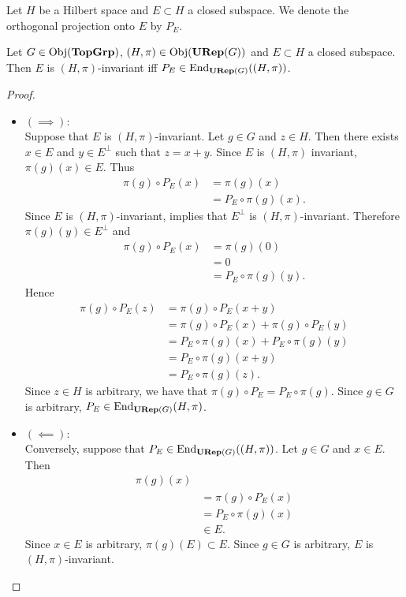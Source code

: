 \documentclass{book}
\begin{document}
\begin{note}
	Let $H$ be a Hilbert space and $E \subset H$ a closed subspace. We denote the orthogonal projection onto $E$ by $P_E$.
\end{note}

\begin{ex}
	Let $G \in \operatorname{Obj}(\operatorname*{\text{\textbf{TopGrp}}})$, $(H, \pi) \in \operatorname{Obj}(\operatorname*{\text{\textbf{URep}}}(G))$ and $E \subset H$ a closed subspace. Then $E$ is $(H, \pi)$-invariant iff $P_E \in \operatorname{\text{End}}_{\operatorname*{\text{\textbf{URep}}}(G)}((H, \pi))$.
\end{ex}

\begin{proof}\
	\begin{itemize}
		\item $(\implies):$ \\
		Suppose that $E$ is $(H, \pi)$-invariant. Let $g \in G$ and $z \in H$. Then there exists $x \in E$ and $y \in E^{\perp}$ such that $z = x+y$. Since $E$ is $(H, \pi)$ invariant, $\pi(g)(x) \in E$. Thus 
		\begin{align*}
			\pi(g) \circ P_E (x) 
			& = \pi(g)(x) \\
			& = P_E \circ \pi(g)(x).
		\end{align*} 
		Since $E$ is $(H, \pi)$-invariant,  implies that $E^{\perp}$ is $(H, \pi)$-invariant. Therefore $\pi(g)(y) \in E^{\perp}$ and
		\begin{align*}
			\pi(g) \circ P_E (x) 
			& = \pi(g)(0) \\
			& = 0 \\
			& = P_E \circ \pi(g)(y).
		\end{align*}
		Hence 
		\begin{align*}
			\pi(g) \circ P_E (z)
			& = \pi(g) \circ P_E (x + y) \\
			& = \pi(g) \circ P_E (x) + \pi(g) \circ P_E(y) \\
			& = P_E \circ \pi(g)(x) + P_E \circ \pi(g)(y) \\
			& = P_E \circ \pi(g)(x + y) \\
			& = P_E \circ \pi(g)(z).
		\end{align*}
		Since $z \in H$ is arbitrary, we have that $\pi(g) \circ P_E = P_E \circ \pi(g)$. Since $g \in G$ is arbitrary, $P_E \in \operatorname{\text{End}}_{\operatorname*{\text{\textbf{URep}}}(G)}(H, \pi)$. 
		\item $(\impliedby):$ \\
		Conversely, suppose that $P_E \in \operatorname{\text{End}}_{\operatorname*{\text{\textbf{URep}}}(G)}((H, \pi))$. Let $g \in G$ and $x \in E$. Then 
		\begin{align*}
			\pi(g)(x) \\
			& = \pi(g) \circ P_E (x) \\
			& = P_E \circ \pi(g) (x) \\
			& \in E.	
		\end{align*}
		Since $x \in E$ is arbitrary, $\pi(g)(E) \subset E$. Since $g \in G$ is arbitrary, $E$ is $(H, \pi)$-invariant. 
	\end{itemize}
\end{proof}
	
\end{document}
